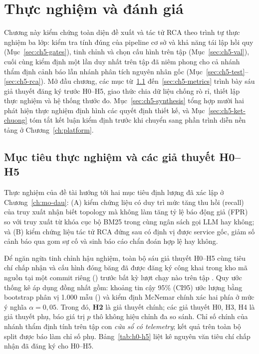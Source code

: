 
\chapter{Thực nghiệm và đánh giá}
\label{ch:thuc-nghiem}

Chương này kiểm chứng toàn diện đề xuất \CTAV{} và tác tử RCA theo trình tự thực nghiệm ba lớp: kiểm tra tính đúng của pipeline cơ sở và khả năng tái lập hồi quy (Mục~\ref{sec:ch5-gates}), tinh chỉnh và chọn cấu hình trên tập  (Mục~\ref{sec:ch5-val}), cuối cùng kiểm định một lần duy nhất trên tập  đã niêm phong cho cả nhánh thẩm định cảnh báo lẫn nhánh phân tích nguyên nhân gốc (Mục~\ref{sec:ch5-test}--\ref{sec:ch5-rca}). Mở đầu chương, các mục từ~\ref{sec:ch5-hypotheses} đến~\ref{sec:ch5-metrics} trình bày sáu giả thuyết đăng ký trước H0--H5, giao thức chia dữ liệu chống rò rỉ, thiết lập thực nghiệm và hệ thống thước đo. Mục~\ref{sec:ch5-synthesis} tổng hợp mười hai phát hiện thực nghiệm định hình các quyết định thiết kế, và Mục~\ref{sec:ch5-ket-chuong} tóm tắt kết luận kiểm định trước khi chuyển sang phần trình diễn nền tảng ở Chương~\ref{ch:platform}.

\section{Mục tiêu thực nghiệm và các giả thuyết H0--H5}
\label{sec:ch5-hypotheses}

Thực nghiệm của đề tài hướng tới hai mục tiêu định lượng đã xác lập ở Chương~\ref{ch:mo-dau}: (A) kiểm chứng liệu \CTAV{} có duy trì mức tăng thu hồi (recall) của truy xuất nhận biết topology mà không làm tăng tỷ lệ báo động giả (FPR) so với truy xuất từ khóa cục bộ BM25 trong cùng ngân sách gọi LLM hay không; và (B) kiểm chứng liệu tác tử RCA đứng sau \CTAV{} có định vị được service gốc, giảm số cảnh báo qua gom sự cố và sinh báo cáo chẩn đoán hợp lệ hay không.

Để ngăn ngừa tinh chỉnh hậu nghiệm, toàn bộ sáu giả thuyết H0--H5 cùng tiêu chí chấp nhận và cấu hình đóng băng đã được đăng ký công khai trong kho mã nguồn tại một commit riêng () trước bất kỳ lượt chạy nào trên tập . Quy ước thống kê áp dụng đồng nhất gồm: khoảng tin cậy 95\% (CI95) ước lượng bằng bootstrap phân vị 1.000 mẫu () và kiểm định McNemar chính xác hai phía ở mức ý nghĩa $\alpha = 0{,}05$. Trong đó, \textbf{H2} là giả thuyết chính; các giả thuyết H0, H3, H4 là giả thuyết phụ, báo giá trị $p$ thô không hiệu chỉnh đa so sánh. Chỉ số chính của nhánh thẩm định tính trên tập con \emph{cửa sổ có telemetry}; kết quả trên toàn bộ split được báo làm chỉ số phụ. Bảng~\ref{tab:h0-h5} liệt kê nguyên văn tiêu chí chấp nhận đã đăng ký cho H0--H5.

